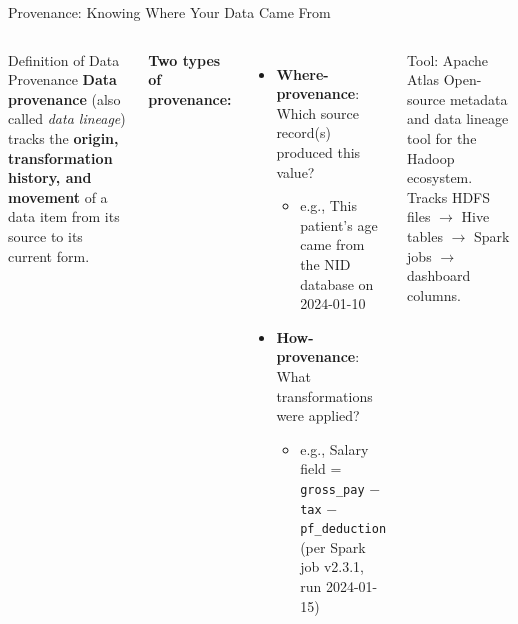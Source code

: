 \documentclass[aspectratio=169,10pt]{beamer}
\begin{document}
\begin{frame}{Provenance: Knowing Where Your Data Came From}
  \begin{columns}[T]
      \begin{block}{Definition of Data Provenance}
        \textbf{Data provenance} (also called \emph{data lineage}) tracks the \textbf{origin, transformation history, and movement} of a data item from its source to its current form.
      \end{block}
      \vspace{6pt}
      \textbf{Two types of provenance:}
      \begin{itemize}
        \item \textbf{Where-provenance}: Which source record(s) produced this value?
        \begin{itemize}
          \small\item e.g., This patient's age came from the NID database on 2024-01-10
        \end{itemize}
        \item \textbf{How-provenance}: What transformations were applied?
        \begin{itemize}
          \small\item e.g., Salary field = \texttt{gross\_pay} $-$ \texttt{tax} $-$ \texttt{pf\_deduction} (per Spark job v2.3.1, run 2024-01-15)
        \end{itemize}
      \end{itemize}
      \vspace{4pt}
      \begin{exampleblock}{Tool: Apache Atlas}
        Open-source metadata and data lineage tool for the Hadoop ecosystem.  Tracks HDFS files $\to$ Hive tables $\to$ Spark jobs $\to$ dashboard columns.
      \end{exampleblock}


\end{columns}
\end{frame}
\end{document}
